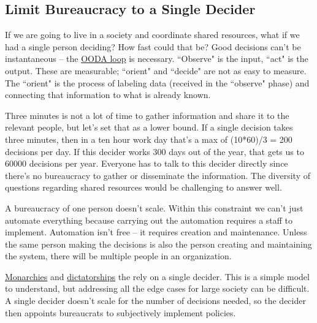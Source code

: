 \subsection{Limit Bureaucracy to a Single Decider}
If we are going to live in a society and coordinate shared resources, what if we had a single person deciding? How fast could that be? Good decisions can't be instantaneous -- the \href{https://en.wikipedia.org/wiki/OODA_loop}{OODA loop} is necessary. 
``Observe" is the input, ``act" is the output. These are measurable; ``orient" and ``decide" are not as easy to measure. The ``orient" is the process of labeling data (received in the ``observe" phase) and connecting that information to what is already known.

Three minutes is not a lot of time to gather information and share it to the relevant people, but let's set that as a lower bound.
If a single decision takes three minutes, then in a ten hour work day that's a max of (10*60)/3 = 200 decisions per day. If this decider works 300 days out of the year, that gets us to 60000 decisions per year. Everyone has to talk to this decider directly since there's no bureaucracy to gather or disseminate the information. The diversity of questions regarding shared resources would be challenging to answer well.

A bureaucracy of one person doesn't scale. Within this constraint we can't just automate everything because carrying out the automation requires a staff to implement. Automation isn't free -- it requires creation and maintenance. Unless the same person making the decisions is also the person creating and maintaining the system, there will be multiple people in an organization.


\href{https://en.wikipedia.org/wiki/Monarchy}{Monarchies} and \href{https://en.wikipedia.org/wiki/Dictator}{dictatorships} the rely on a single decider. This is a simple model to understand, but addressing all the edge cases for large society can be difficult. A single decider doesn't scale for the number of decisions needed, so the decider then appoints bureaucrats to subjectively implement policies. 



